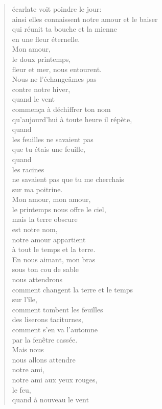 \documentclass[11pt,a4paper]{book}
\begin{document}
\begin{verse}
écarlate voit poindre le jour: \\
ainsi elles connaissent notre amour et le baiser \\
qui réunit ta bouche et la mienne \\
en une fleur éternelle. \\
Mon amour, \\
le doux printemps, \\
fleur et mer, nous entourent. \\
Nous ne l'échangeâmes pas \\
contre notre hiver, \\
quand le vent \\
commen\c{c}a à déchiffrer ton nom \\
qu'aujourd'hui à toute heure il répète, \\
quand \\
les feuilles ne savaient pas \\
que tu étais une feuille, \\
quand \\
les racines \\
ne savaient pas que tu me cherchais \\
sur ma poitrine. \\
Mon amour, mon amour, \\
le printemps nous offre le ciel, \\
mais la terre obscure \\
est notre nom, \\
notre amour appartient \\
à tout le temps et la terre. \\
En nous aimant, mon bras \\
sous ton cou de sable \\
nous attendrons \\
comment changent la terre et le temps \\
sur l'île, \\
comment tombent les feuilles \\
des liserons taciturnes, \\
comment s'en va l'automne \\
par la fenêtre cassée. \\
Mais nous \\
nous allons attendre \\
notre ami, \\
notre ami aux yeux rouges, \\
le feu, \\
quand à nouveau le vent \\

\end{verse}
\end{document}
